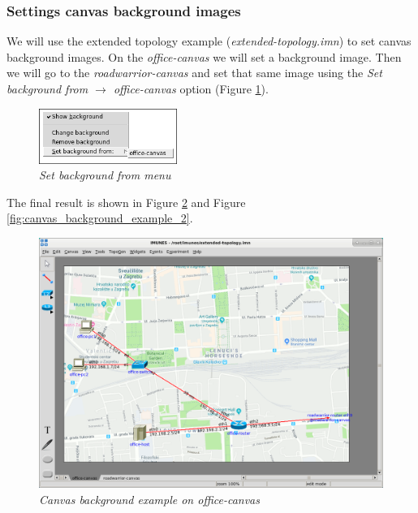 \subsubsection{Settings canvas background images}

We will use the extended topology example (\emph{extended-topology.imn}) to set
canvas background images. On the \emph{office-canvas} we will set a background
image. Then we will go to the \emph{roadwarrior-canvas} and set that same image
using the \emph{Set background from $\to$ office-canvas} option (Figure
\ref{fig:set_background_from}).

\begin{figure}[H]
	\centering
	\vspace{10pt}
	\includegraphics[width=0.4\textwidth]{./images/set_background_from.png}
	\caption{\emph{Set background from menu}}
	\label{fig:set_background_from}
\end{figure}

The final result is shown in Figure \ref{fig:canvas_background_example_1} and
Figure \ref{fig:canvas_background_example_2}.

\begin{figure}[H]
	\centering
	\includegraphics[width=\textwidth]{./images/canvas_background_example_1.png}
	\caption{\emph{Canvas background example on office-canvas}}
	\label{fig:canvas_background_example_1}
\end{figure}

